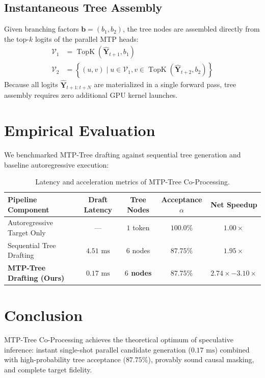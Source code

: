 \documentclass[11pt,a4paper]{article}
\begin{document}
\subsection{Instantaneous Tree Assembly}
Given branching factors $\mathbf{b} = (b_1, b_2)$, the tree nodes are assembled directly from the top-$k$ logits of the parallel MTP heads:
\begin{align}
\mathcal{V}_1 &= \operatorname{TopK}\left(\hat{\mathbf{Y}}_{t+1}, b_1\right) \\
\mathcal{V}_2 &= \left\{ (u, v) \mid u \in \mathcal{V}_1, v \in \operatorname{TopK}\left(\hat{\mathbf{Y}}_{t+2}, b_2\right) \right\}
\end{align}
Because all logits $\hat{\mathbf{Y}}_{t+1:t+N}$ are materialized in a single forward pass, tree assembly requires zero additional GPU kernel launches.

\section{Empirical Evaluation}
We benchmarked MTP-Tree drafting against sequential tree generation and baseline autoregressive execution:
\begin{table}[h]
\centering
\begin{tabular}{lcccc}
\toprule
\textbf{Pipeline Component} & \textbf{Draft Latency} & \textbf{Tree Nodes} & \textbf{Acceptance $\alpha$} & \textbf{Net Speedup} \\
\midrule
Autoregressive Target Only  & --- & $1$ token & $100.0\%$ & $1.00\times$ \\
Sequential Tree Drafting    & $4.51\text{ ms}$ & $6$ nodes & $87.75\%$ & $1.95\times$ \\
\textbf{MTP-Tree Drafting (Ours)} & \textbf{$0.17\text{ ms}$} & \textbf{$6$ nodes} & \textbf{$87.75\%$} & \textbf{$2.74\times - 3.10\times$} \\
\bottomrule
\end{tabular}
\caption{Latency and acceleration metrics of MTP-Tree Co-Processing.}
\end{table}

\section{Conclusion}
MTP-Tree Co-Processing achieves the theoretical optimum of speculative inference: instant single-shot parallel candidate generation ($0.17\text{ ms}$) combined with high-probability tree acceptance ($87.75\%$), provably sound causal masking, and complete target fidelity.
\end{document}
